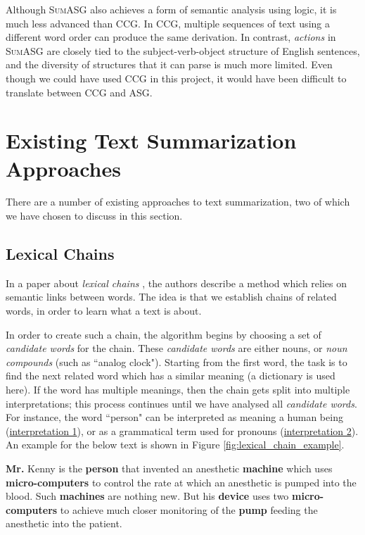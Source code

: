 Although \textsc{SumASG} also achieves a form of semantic analysis using logic, it is much less advanced than CCG. In CCG, multiple sequences of text using a different word order can produce the same derivation. In contrast, \textit{actions} in \textsc{SumASG} are closely tied to the subject-verb-object structure of English sentences, and the diversity of structures that it can parse is much more limited. Even though we could have used CCG in this project, it would have been difficult to translate between CCG and ASG.

\section{Existing Text Summarization Approaches}
\label{sec:summarization_approaches}

There are a number of existing approaches to text summarization, two of which we have chosen to discuss in this section.

\subsection{Lexical Chains}

In a paper about \textit{lexical chains} \cite{barzilay_using_1997}, the authors describe a method which relies on semantic links between words. The idea is that we establish chains of related words, in order to learn what a text is about.

In order to create such a chain, the algorithm begins by choosing a set of \textit{candidate words} for the chain. These \textit{candidate words} are either nouns, or \textit{noun compounds} (such as ``analog clock"). Starting from the first word, the task is to find the next related word which has a similar meaning (a dictionary is used here). If the word has multiple meanings, then the chain gets split into multiple interpretations; this process continues until we have analysed all \textit{candidate words}.  For instance, the word ``person" can be interpreted as meaning a human being (\underline{interpretation 1}), or as a grammatical term used for pronouns (\underline{interpretation 2}). An example for the below text is shown in Figure \ref{fig:lexical_chain_example}.

\begin{displayquote}
\textbf{Mr.} Kenny is the \textbf{person} that invented an anesthetic \textbf{machine} which uses \textbf{micro-computers} to control the rate at which an anesthetic is pumped into the blood. Such \textbf{machines} are nothing new. But his \textbf{device} uses two \textbf{micro-computers} to achieve much closer monitoring of the \textbf{pump} feeding the anesthetic into the patient. \cite{barzilay_using_1997}
\end{displayquote}

